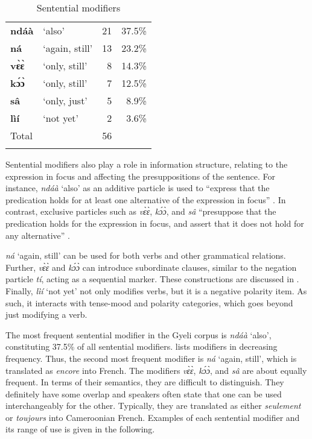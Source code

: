 \begin{table}
\begin{tabular}{llrr}
 \lsptoprule
{\bfseries ndáà} & `also' & 21 & 37.5\%\\
{\bfseries ná} & `again, still' & 13 & 23.2\% \\
{\bfseries vɛ̀ɛ̀} & `only, still' & 8 & 14.3\% \\
{\bfseries kɔ́ɔ̀} & `only, still' & 7 & 12.5\% \\
{\bfseries sâ} & `only, just' &  5 & 8.9\% \\
{\bfseries lìí}  & `not yet'    & 2  & 3.6\%   \\
 \midrule
Total & & 56 \\
 \lspbottomrule
\end{tabular}
\caption{Sentential modifiers}
\label{Tab:SentMod}
\end{table}

Sentential modifiers also play a role in information structure, relating to the expression in focus and affecting the presuppositions of the sentence. For instance, {\itshape ndáà} `also' as an additive particle is used to  ``express that the predication holds for at least one alternative of the expression in focus'' \citep[111]{krifka99}. In contrast,  exclusive particles such as {\itshape vɛ̀ɛ̀}, {\itshape kɔ́ɔ̀}, and {\itshape sâ} ``presuppose that the predication holds for the expression in focus, and assert that it does not hold for any alternative'' \citep[111]{krifka99}. 

{\itshape ná} `again, still' can be used for both verbs and other grammatical relations. Further, {\itshape vɛ̀ɛ̀} and {\itshape kɔ́ɔ̀} can introduce subordinate clauses, similar to the negation particle {\itshape tí}, acting as a sequential marker. These constructions are discussed in . Finally, {\itshape lìí} `not yet' not only modifies verbs, but it is a negative polarity item. As such, it interacts with tense-mood and polarity categories, which goes beyond just modifying a verb.  

The most frequent sentential modifier in the Gyeli corpus is {\itshape ndáà} `also', constituting 37.5\% of all sentential modifiers.  lists modifiers in decreasing frequency. Thus, the second most frequent modifier is {\itshape ná} `again, still', which is translated as {\itshape encore} into French. The modifiers {\itshape vɛ̀ɛ̀}, {\itshape kɔ́ɔ̀}, and {\itshape sâ} are about equally frequent. In terms of their semantics, they are difficult to distinguish. They definitely have some overlap and speakers often state that one can be used interchangeably for the other. Typically, they are translated as either {\itshape seulement} or {\itshape toujours} into Cameroonian French.
Examples of each sentential modifier and its range of use is given in the following.


